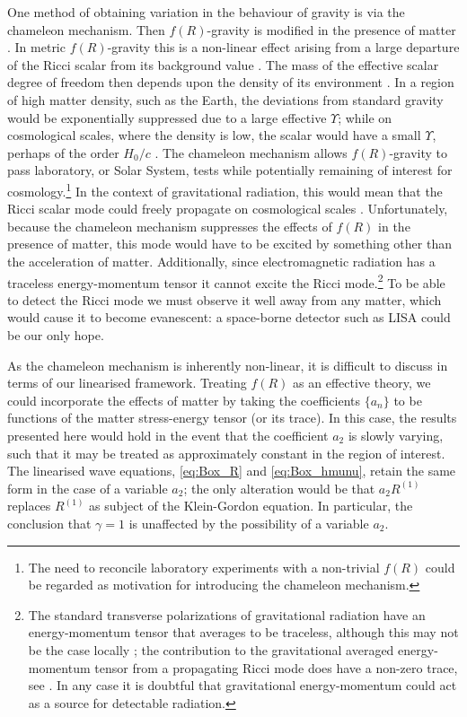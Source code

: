 One method of obtaining variation in the behaviour of gravity is via the chameleon mechanism. Then $f(R)$-gravity is modified in the presence of matter \citep{Khoury2004, Khoury2004a, Brax2004, Khoury2013}. In metric $f(R)$-gravity this is a non-linear effect arising from a large departure of the Ricci scalar from its background value \citep{DeFelice2010}. The mass of the effective scalar degree of freedom then depends upon the density of its environment \citep{Faulkner2007, Li2007}. In a region of high matter density, such as the Earth, the deviations from standard gravity would be exponentially suppressed due to a large effective $\Upsilon$; while on cosmological scales, where the density is low, the scalar would have a small $\Upsilon$, perhaps of the order $H_0/c$ \citep{Khoury2004, Khoury2004a}. The chameleon mechanism allows $f(R)$-gravity to pass laboratory, or Solar System, tests while potentially remaining of interest for cosmology.\footnote{The need to reconcile laboratory experiments with a non-trivial $f(R)$ could be regarded as motivation for introducing the chameleon mechanism.} In the context of gravitational radiation, this would mean that the Ricci scalar mode could freely propagate on cosmological scales \citep{Corda2009}. Unfortunately, because the chameleon mechanism suppresses the effects of $f(R)$ in the presence of matter, this mode would have to be excited by something other than the acceleration of matter. Additionally, since electromagnetic radiation has a traceless energy-momentum tensor it cannot excite the Ricci mode.\footnote{The standard transverse polarizations of gravitational radiation have an energy-momentum tensor that averages to be traceless, although this may not be the case locally \citep{Butcher2010}; the contribution to the gravitational averaged energy-momentum tensor from a propagating Ricci mode does have a non-zero trace, see . In any case it is doubtful that gravitational energy-momentum could act as a source for detectable radiation.} To be able to detect the Ricci mode we must observe it well away from any matter, which would cause it to become evanescent: a space-borne detector such as LISA could be our only hope.

As the chameleon mechanism is inherently non-linear, it is difficult to discuss in terms of our linearised framework. Treating $f(R)$ as an effective theory, we could incorporate the effects of matter by taking the coefficients $\{a_n\}$ to be functions of the matter stress-energy tensor (or its trace). In this case, the results presented here would hold in the event that the coefficient $a_2$ is slowly varying, such that it may be treated as approximately constant in the region of interest. The linearised wave equations, \eqref{eq:Box_R} and \eqref{eq:Box_hmunu}, retain the same form in the case of a variable $a_2$; the only alteration would be that $a_2 R^{(1)}$ replaces $R^{(1)}$ as subject of the Klein-Gordon equation. In particular, the conclusion that $\gamma = 1$ is unaffected by the possibility of a variable $a_2$.

